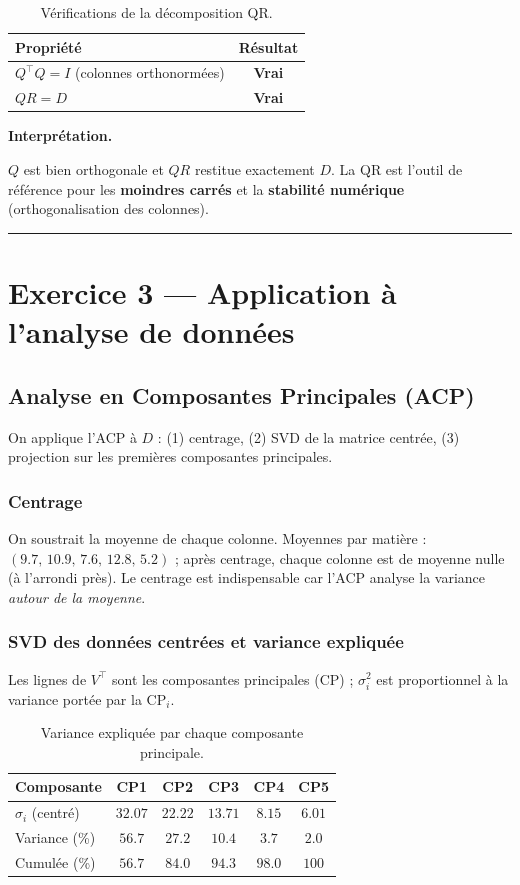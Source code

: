 \documentclass[11pt,a4paper]{article}
\newenvironment{interpret}{%
  \par\medskip\noindent
  \setlength{\fboxsep}{8pt}%
  \begin{lrbox}{\interpretbox}%
  \begin{minipage}{\dimexpr\linewidth-2\fboxsep-4pt\relax}%
  \textbf{\textcolor{boxline}{Interprétation.}}\;\ignorespaces
}{%
  \end{minipage}%
  \end{lrbox}%
  \noindent\textcolor{boxline}{\rule{3pt}{\dimexpr\ht\interpretbox+\dp\interpretbox\relax}}%
  \colorbox{boxgray}{\usebox{\interpretbox}}%
  \par\medskip
}
\begin{document}
\begin{table}[H]\centering
\caption{Vérifications de la décomposition QR.}
\begin{tabular}{lc}
\toprule
Propriété & Résultat\\
\midrule
$Q^{\top}Q = I$ (colonnes orthonormées) & \textbf{Vrai}\\
$QR = D$ & \textbf{Vrai}\\
\bottomrule
\end{tabular}
\end{table}

\begin{interpret}
$Q$ est bien orthogonale et $QR$ restitue exactement $D$. La QR est l'outil de référence pour les
\textbf{moindres carrés} et la \textbf{stabilité numérique} (orthogonalisation des colonnes).
\end{interpret}

\section{Exercice 3 --- Application à l'analyse de données}

\subsection{Analyse en Composantes Principales (ACP)}
On applique l'ACP à $D$ : (1) centrage, (2) SVD de la matrice centrée, (3) projection sur les
premières composantes principales.

\subsubsection{Centrage}
On soustrait la moyenne de chaque colonne. Moyennes par matière :
$(9.7,\,10.9,\,7.6,\,12.8,\,5.2)$ ; après centrage, chaque colonne est de moyenne nulle
(à l'arrondi près). Le centrage est indispensable car l'ACP analyse la variance \emph{autour de
la moyenne}.

\subsubsection{SVD des données centrées et variance expliquée}
Les lignes de $V^{\top}$ sont les composantes principales (CP) ; $\sigma_i^2$ est proportionnel
à la variance portée par la CP$_i$.

\begin{table}[H]\centering
\caption{Variance expliquée par chaque composante principale.}
\begin{tabular}{lccccc}
\toprule
Composante & CP1 & CP2 & CP3 & CP4 & CP5\\
\midrule
$\sigma_i$ (centré) & $32.07$ & $22.22$ & $13.71$ & $8.15$ & $6.01$\\
Variance (\%) & $56.7$ & $27.2$ & $10.4$ & $3.7$ & $2.0$\\
Cumulée (\%) & $56.7$ & $\mathbf{84.0}$ & $94.3$ & $98.0$ & $100$\\
\bottomrule
\end{tabular}
\end{table}
\end{document}
